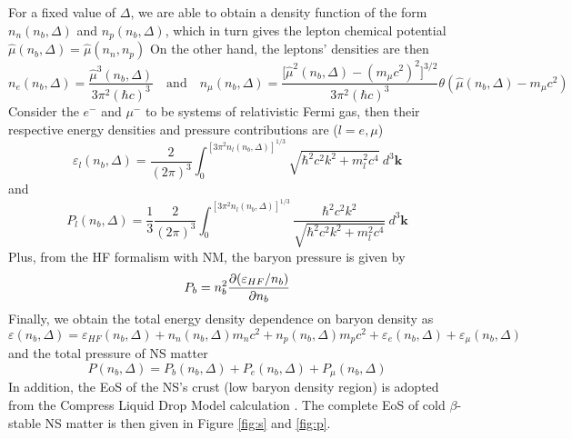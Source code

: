 For a fixed value of $\Delta$, we are able to obtain a density function of the form $n_n (n_b, \Delta)$ and $n_p (n_b, \Delta)$, which in turn gives the lepton chemical potential $\hat{\mu}(n_b,\Delta) = \hat{\mu}(n_n,n_p)$ On the other hand, the leptons' densities are then \citep{loan2011equation}
\begin{equation}
        n_e(n_b,\Delta) = \frac{ \hat{\mu}^3(n_b,\Delta)}{ 3\pi^2 (\hbar c)^3} \quad\text{and}\quad n_\mu(n_b,\Delta) = \frac{ \Big[\hat{\mu}^2(n_b,\Delta) - (m_\mu c^2)^2\Big]^{3/2}}{ 3\pi^2 (\hbar c)^3} \theta(\hat{\mu}(n_b,\Delta)-m_\mu c^2)
\end{equation} 
Consider the $e^-$ and $\mu^-$ to be systems of relativistic Fermi gas, then their respective energy densities and pressure contributions are ($l=e,\mu$) \citep{moustakidis2009equation}
\begin{equation}
        \varepsilon_l(n_b,\Delta) = \frac{ 2}{ (2\pi)^3} \int_{{0}}^{{[3\pi^2n_l(n_b,\Delta)]^{1/3}}} {\sqrt{\hbar^2 c^2 k^2 + m_l^2 c^4}} \: d^3{\mathbf{k}}
\end{equation} 
and
\begin{equation}
        P_l(n_b,\Delta) = \frac{ 1}{ 3} \frac{ 2}{ (2\pi)^3} \int_{{0}}^{{[3\pi^2 n_l(n_b,\Delta)]^{1/3}}} { \frac{ \hbar^2 c^2 k^2}{ \sqrt{\hbar^2 c^2 k^2 + m_l^2 c^4}} } \: d^3{\mathbf{k}}
\end{equation} 
Plus, from the \gls{HF} formalism with \gls{NM}, the baryon pressure is given by
\begin{equation}
        P_b = n_b^2 \pdv{(\varepsilon_{HF}/n_b)}{n_b}
\end{equation}
Finally, we obtain the total energy density dependence on baryon density as 
\begin{equation}
        \varepsilon(n_b,\Delta) = \varepsilon_{HF}(n_b,\Delta) + n_n(n_b,\Delta)m_n c^2 + n_p(n_b,\Delta)m_p c^2 + \varepsilon_e(n_b,\Delta) + \varepsilon_\mu(n_b,\Delta)
\end{equation}
and the total pressure of \gls{NS} matter
\begin{equation}
        P(n_b,\Delta) = P_b(n_b,\Delta) + P_e(n_b,\Delta) + P_\mu(n_b,\Delta)
\end{equation}
In addition, the \gls{EoS} of the \gls{NS}'s crust (low baryon density region) is adopted from the Compress Liquid Drop Model calculation \citep{douchin2000nuclear,douchin2001unified}. The complete \gls{EoS} of cold $\beta$-stable \gls{NS} matter is then given in Figure \ref{fig:s} and \ref{fig:p}.

